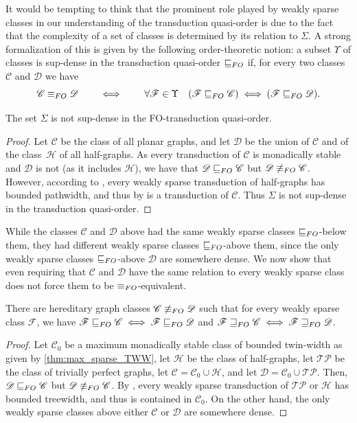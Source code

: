 \documentclass{lmcs}
\newcommand{\Cc}{\mathscr{C}}
\newcommand{\Dd}{\mathscr{D}}
\newcommand{\Hh}{\ensuremath{\mathscr H}}
\newcommand{\Ff}{\mathscr{F}}
\renewcommand{\FO}{{\rm FO}}
\theoremstyle{definition}
\begin{document}
It would be tempting to think that the prominent role played by weakly sparse classes in our understanding of the transduction quasi-order is due to the fact that the complexity of a set of classes is determined by its relation to $\Sigma$. A strong formalization of this is given by the following order-theoretic notion: a subset $\Upsilon$ of classes is sup-dense in the transduction quasi-order $\sqsubseteq_\FO$  if, for every two classes $\Cc$ and $\Dd$ we have
\[
\Cc\equiv_\FO\Dd\qquad\iff\qquad\forall \Ff\in\Upsilon\quad (\Ff\sqsubseteq_\FO\Cc)\iff(\Ff\sqsubseteq_\FO\Dd).
\]

\begin{prop}
	\label{prop:non-sup-dense}
	The  set $\Sigma$ is not sup-dense in the FO-transduction quasi-order.
\end{prop}
\begin{proof}
	Let $\Cc$ be the class of all  planar graphs, and let $\Dd$ be the union of $\Cc$ and of the class~$\Hh$ of all half-graphs.
	As every transduction of $\Cc$ is monadically stable and $\Dd$ is not (as it includes $\Hh$), we have that
	$\Dd\sqsubseteq_\FO\Cc$ but 
	$\Dd\not\equiv_\FO\Cc$. 
		 However, according to \cite{SODA_msrw}, every weakly sparse transduction of half-graphs has bounded pathwidth, and thus by   is a transduction of $\Cc$. Thus $\Sigma$ is not sup-dense in the transduction quasi-order.
\end{proof}

While the classes $\Cc$ and $\Dd$ above had the same weakly sparse classes $\sqsubseteq_\FO$-below them, they had different weakly sparse classes $\sqsubseteq_\FO$-above them, since the only weakly sparse classes $\sqsubseteq_\FO$-above $\Dd$ are somewhere dense. We now show that even requiring that $\Cc$ and $\Dd$ have the same relation to every weakly sparse class does not force them to be $\equiv_\FO$-equivalent.

\begin{prop}
	There are hereditary graph classes $\Cc \not \equiv_\FO \Dd$ such that for every weakly sparse class $\Ff$, we have $\Ff \sqsubseteq_\FO \Cc \iff \Ff \sqsubseteq_\FO \Dd$ and $\Ff \sqsupseteq_\FO \Cc \iff \Ff \sqsupseteq_\FO \Dd$.
	\end{prop}
\begin{proof}
	Let $\Cc_0$ be a maximum monadically stable class of bounded twin-width as given by \cref{thm:max_sparse_TWW}, let $\Hh$ be the class of half-graphs, let $\mathscr{T\!\!P}$ be the class of trivially perfect graphs, let $\Cc = \Cc_0 \cup \Hh$, and let $\Dd = \Cc_0 \cup \mathscr{T\!\!P}$. Then,
	$\Dd\sqsubseteq_\FO\Cc$ but 
	$\Dd\not\equiv_\FO\Cc$.
	  By \cite{Gurski2000}, every weakly sparse transduction of $\mathscr{T\!\!P}$ or $\Hh$ has bounded treewidth, and thus is contained in $\Cc_0$. On the other hand, the only weakly sparse classes above either $\Cc$ or $\Dd$ are somewhere dense.
\end{proof}
	
\end{document}
